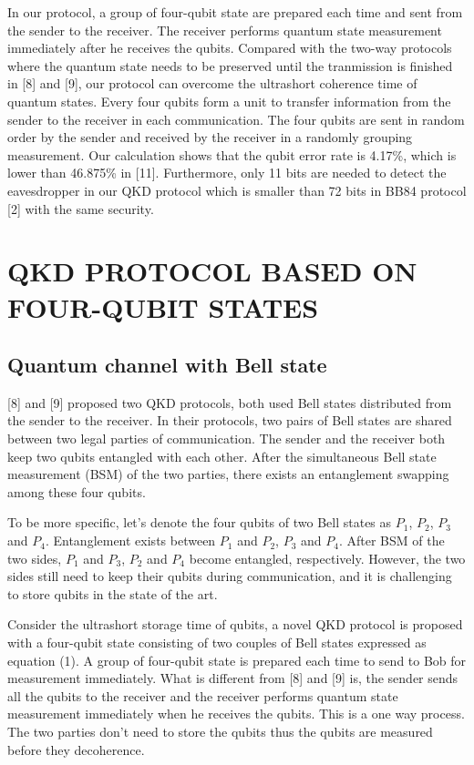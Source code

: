 \documentclass[a4paper,11pt]{article}
\begin{document}
In our protocol, a group of four-qubit state are prepared each time and sent from the sender to the receiver. The receiver performs quantum state measurement immediately after he receives the qubits. Compared with the two-way
protocols where the quantum state needs to be preserved until the tranmission is finished in [8] and [9], our protocol can overcome the ultrashort coherence time of quantum states. Every four qubits form a unit to transfer information from the sender to the receiver in each communication. The four qubits are sent in random order by the sender and received by the receiver in a randomly grouping measurement. Our calculation shows that the qubit error rate is 4.17\%, which is lower than 46.875\% in [11]. Furthermore, only 11 bits are
needed to detect the eavesdropper in our QKD protocol which is smaller than 72 bits in BB84 protocol [2] with the same security.

\section{QKD PROTOCOL BASED ON FOUR-QUBIT STATES}

\subsection{Quantum channel with Bell state}

[8] and [9] proposed two QKD protocols, both used Bell states distributed from the sender to the receiver. In their protocols, two pairs of Bell states are shared between two legal parties of communication. The sender and the receiver both keep two qubits entangled with each other. After the simultaneous Bell state measurement (BSM) of the two parties, there exists an entanglement swapping among these four qubits.

To be more specific, let’s denote the four qubits of two Bell states as $P_1$, $P_2$, $P_3$ and $P_4$. Entanglement exists between $P_1$ and $P_2$, $P_3$ and $P_4$. After BSM of the two sides, $P_1$ and $P_3$, $P_2$ and $P_4$ become entangled, respectively. However, the two sides still need to keep their qubits during communication, and it is challenging to store qubits in the state of the art.

Consider the ultrashort storage time of qubits, a novel QKD protocol is proposed with a four-qubit state consisting of two couples of Bell states expressed as equation (1). A group of four-qubit state is prepared each time to send to Bob for measurement immediately. What is different from [8] and [9]
is, the sender sends all the qubits to the receiver and the receiver performs quantum state measurement immediately when he receives the qubits. This is a one way process. The two parties don’t need to store the qubits thus the qubits are measured before they decoherence.
\end{document}
